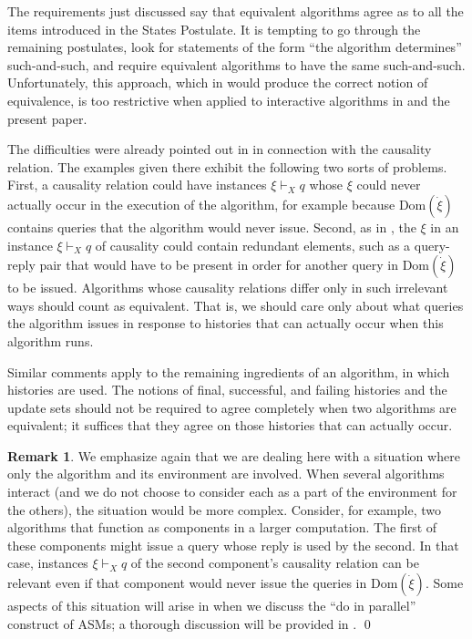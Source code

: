 \documentclass{LMCS}
\theoremstyle{definition}
\newtheorem{rmk}[thm]{Remark}
\newcommand{\ans}{\dot}
\newcommand{\dom}[1]{\ensuremath{{\text{Dom}}(#1)}}
\begin{document}
The requirements just discussed say that equivalent algorithms agree
as to all the items introduced in the States Postulate.  It is
tempting to go through the remaining postulates, look for statements
of the form ``the algorithm determines'' such-and-such, and require
equivalent algorithms to have the same such-and-such.  Unfortunately,
this approach, which in \cite{seqth} would produce the correct notion
of equivalence, is too restrictive when applied to interactive
algorithms in \cite{oa1} and the present paper.

The difficulties were already pointed out in \cite[Section~6]{oa1} in
connection with the causality relation.  The examples given there
exhibit the following two sorts of problems.  First, a causality
relation could have instances $\xi\vdash_Xq$ whose $\xi$ could never
actually occur in the execution of the algorithm, for example because
$\dom{\ans\xi}$ contains queries that the algorithm would never issue.
Second, as in \cite[Example~6.4]{oa2}, the $\xi$ in an instance
$\xi\vdash_Xq$ of causality could contain redundant elements, such as
a query-reply pair that would have to be present in order for another
query in $\dom{\ans\xi}$ to be issued.  Algorithms whose causality
relations differ only in such irrelevant ways should count as
equivalent.  That is, we should care only about what queries the
algorithm issues in response to histories that can actually occur when
this algorithm runs.

Similar comments apply to the remaining ingredients of an algorithm,
in which histories are used.  The notions of final, successful, and
failing histories and the update sets should not be required to agree
completely when two algorithms are equivalent; it suffices that they
agree on those histories that can actually occur.

\begin{rmk} \label{cpt2} We emphasize again that we are dealing here
  with a situation where only the algorithm and its environment are
  involved.  When several algorithms interact (and we do not choose to
  consider each as a part of the environment for the others), the
  situation would be more complex.  Consider, for example, two
  algorithms that function as components in a larger computation.  The
  first of these components might issue a query whose reply is used by
  the second.  In that case, instances $\xi\vdash_Xq$ of the second
  component's causality relation can be relevant even if that
  component would never issue the queries in $\dom{\ans\xi}$.  Some
  aspects of this situation will arise in \cite{ga2} when we discuss
  the ``do in parallel'' construct of ASMs; a thorough discussion will
  be provided in \cite{composite}.  \qed\end{rmk}
\end{document}
